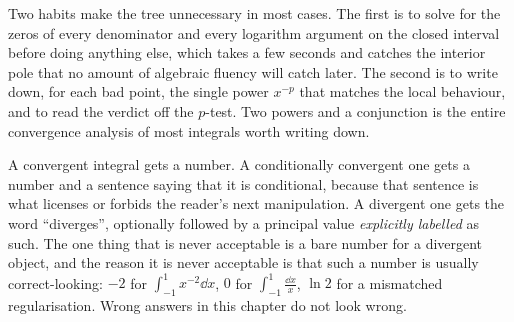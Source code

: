 Two habits make the tree unnecessary in most cases. The first is to solve for the zeros of every denominator and every logarithm argument on the closed interval before doing anything else, which takes a few seconds and catches the interior pole that no amount of algebraic fluency will catch later. The second is to write down, for each bad point, the single power $x^{-p}$ that matches the local behaviour, and to read the verdict off the $p$-test. Two powers and a conjunction is the entire convergence analysis of most integrals worth writing down.

\begin{keynote}
A convergent integral gets a number. A conditionally convergent one gets a number and a sentence saying that it is conditional, because that sentence is what licenses or forbids the reader's next manipulation. A divergent one gets the word ``diverges'', optionally followed by a principal value \emph{explicitly labelled} as such. The one thing that is never acceptable is a bare number for a divergent object, and the reason it is never acceptable is that such a number is usually correct-looking: $-2$ for $\int_{-1}^{1}x^{-2}\dd x$, $0$ for $\int_{-1}^{1}\tfrac{\dd x}{x}$, $\ln2$ for a mismatched regularisation. Wrong answers in this chapter do not look wrong.
\end{keynote}

